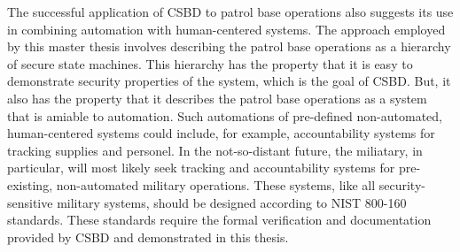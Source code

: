 \documentclass[../../main/main.tex]{subfiles}
\begin{document}
The successful application of CSBD to patrol base operations also suggests its use in combining automation with human-centered systems.  The approach employed by this master thesis involves describing the patrol base operations as a hierarchy of secure state machines.  This hierarchy has the property that it is easy to demonstrate security properties of the system, which is the goal of CSBD.  But, it also has the property that it describes the patrol base operations as a system that is amiable to automation.  Such automations of pre-defined non-automated, human-centered systems could include, for example, accountability systems for tracking supplies and personel.  In the not-so-distant future, the miliatary, in particular, will most likely seek tracking and accountability systems for pre-existing, non-automated military operations.  These systems, like all security-sensitive military systems, should be designed according to NIST 800-160 standards.  These standards require the formal verification and documentation provided by CSBD and demonstrated in this thesis.   
\end{document}
